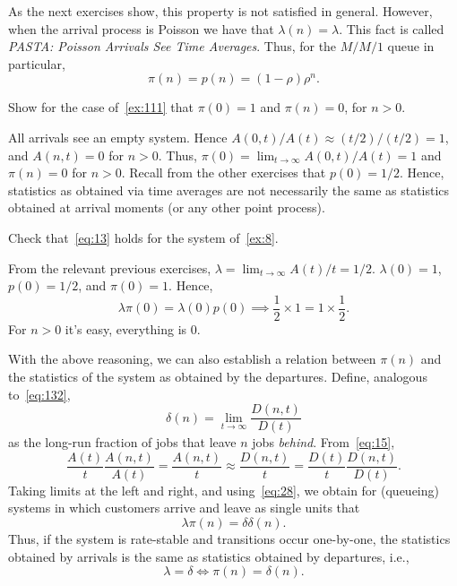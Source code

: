 As the next exercises show, this property is not satisfied in general.
However, when the arrival process is Poisson we have that $\lambda(n)=\lambda$.
This fact is called \emph{PASTA: Poisson Arrivals See Time Averages}.
Thus, for the $M/M/1$ queue in particular,
\begin{equation*}
 \pi(n) = p(n) = (1-\rho)\rho^n.
\end{equation*}

\begin{exercise} 
Show for the case of~\cref{ex:111} that $\pi(0)=1$ and $\pi(n)=0$, for $n>0$.
\begin{solution}
  All arrivals see an empty system.
  Hence $A(0,t)/A(t) \approx (t/2)/(t/2) = 1$, and $A(n,t)=0$ for $n>0$.
  Thus, $\pi(0) = \lim_{t\to\infty} A(0,t)/A(t) = 1$ and $\pi(n)=0$ for $n>0$.
  Recall from the other exercises that $p(0)=1/2$.
  Hence, statistics as obtained via time averages are not necessarily the same as statistics obtained at arrival moments (or any other point process).
\end{solution}

\end{exercise}

\begin{exercise}
 Check that~\cref{eq:13} holds for the system of~\cref{ex:8}.
\begin{solution}
From the relevant previous exercises, $\lambda = \lim_{t\to\infty} A(t)/t = 1/2$. $\lambda(0)=1$, $p(0)=1/2$, and $\pi(0)=1$. Hence,
\begin{equation*}
 \lambda \pi(0) = \lambda(0) p(0) \implies \frac 1 2 \times 1 = 1\times \frac 1 2.
\end{equation*}
For $n>0$ it's easy, everything is 0.
\end{solution}
\end{exercise}





With the above reasoning, we can also establish a relation between $\pi(n)$ and the statistics of the system as obtained by the departures.
Define, analogous to~\cref{eq:132}, 
\begin{equation}
 \label{eq:33}
 \delta(n) = \lim_{t\to\infty} \frac{D(n,t)}{D(t)}
\end{equation}
as the long-run fraction of jobs that leave $n$ jobs \emph{behind}.
From~\cref{eq:15},
\begin{equation*}
\frac{A(t)}t \frac{A(n,t)}{A(t)} = \frac{A(n,t)}t \approx \frac{D(n,t)}t 
= \frac{D(t)}t \frac{D(n,t)}{D(t)}.
\end{equation*}
Taking limits at the left and right, and using~\cref{eq:28}, we obtain for (queueing) systems in which customers arrive and leave as single units that
\begin{equation}
 \label{eq:36}
 \lambda \pi(n) = \delta \delta(n).
\end{equation}
Thus, if the system is rate-stable and transitions occur one-by-one, the statistics obtained by arrivals is the same as statistics obtained by departures, i.e., 
\begin{equation}
 \label{eq:39}
\lambda = \delta \iff \pi(n) = \delta(n).
\end{equation}

